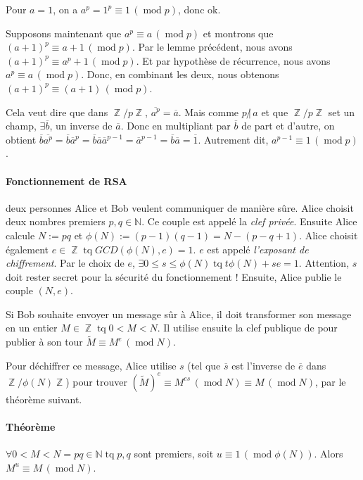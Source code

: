 \documentclass{article}
\DeclareMathOperator{\tq}{\text{ tq }}
\DeclareMathOperator{\Z}{\mathbb Z}
\DeclareMathOperator{\modulo}{mod}
\newcommand{\cmod}[1]{\, (\modulo #1)}
\begin{document}
			Pour $a = 1$, on a $a^p = 1^p \equiv 1 \cmod p$, donc ok.

			Supposons maintenant que $a^p \equiv a \cmod p$ et montrons que $(a+1)^p \equiv a+1 \cmod p$. Par le lemme précédent, nous avons
			$(a+1)^p \equiv a^p + 1 \cmod p$.
			Et par hypothèse de récurrence, nous avons $a^p \equiv a \cmod p$. Donc, en combinant les deux, nous obtenons $(a+1)^p \equiv (a+1) \cmod p$.

			Cela veut dire que dans $\Z/p\Z$, $\overline{a^p} = \overline a$. Mais comme $p \, \not | \, a$ et que $\Z/p\Z$ set un champ, $\exists \overline b$, un inverse
			de $\overline a$. Donc en multipliant par $\overline b$ de part et d'autre, on obtient $\overline b \overline{a^p} = \overline b \overline{a}^p
			= \overline b \overline a \overline a^{p-1} = \overline a^{p-1} = \overline b \overline a = \overline 1$. Autrement dit, $a^{p-1} \equiv 1 \cmod p$.

			\paragraph{Fonctionnement de RSA} deux personnes Alice et Bob veulent communiquer de manière sûre. Alice choisit deux nombres premiers $p, q \in \mathbb N$.
			Ce couple est appelé la \textit{clef privée}. Ensuite Alice calcule $N := pq$ et $\phi(N) := (p-1)(q-1) = N - (p-q+1)$. Alice choisit également $e \in \Z \tq
			GCD(\phi(N), e) = 1$. $e$ est appelé \textit{l'exposant de chiffrement}. Par le choix de $e$, $\exists 0 \leq s \leq \phi(N) \tq t\phi(N) + se = 1$.
			Attention, $s$ doit rester secret pour la sécurité du fonctionnement ! Ensuite, Alice publie le couple $(N, e)$.

			Si Bob souhaite envoyer un message sûr à Alice, il doit transformer son message en un entier $M \in \Z \tq 0 < M < N$. Il utilise ensuite la clef publique de
			pour publier à son tour $\widetilde M \equiv M^e \cmod N$.

			Pour déchiffrer ce message, Alice utilise $s$ (tel que $\overline s$ est l'inverse de $\overline e$ dans $\Z/\phi(N)\Z$) pour trouver
			$(\widetilde M)^e \equiv M^{es} \cmod N \equiv M \cmod N$, par le théorème suivant.

			\paragraph{Théorème} $\forall 0 < M < N = pq \in \mathbb N \tq p, q$ sont premiers, soit $u \equiv 1 \cmod{\phi(N)}$. Alors $M^u \equiv M \cmod N$.
\end{document}

